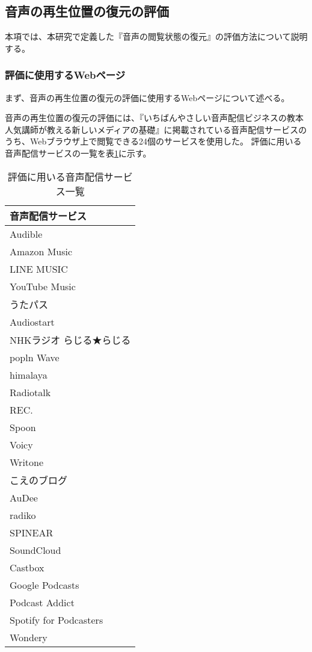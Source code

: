 \subsection{音声の再生位置の復元の評価}
本項では、本研究で定義した『音声の閲覧状態の復元』の評価方法について説明する。

\subsubsection{評価に使用するWebページ}
まず、音声の再生位置の復元の評価に使用するWebページについて述べる。

音声の再生位置の復元の評価には、『いちばんやさしい音声配信ビジネスの教本 人気講師が教える新しいメディアの基礎』\cite{easiest-audio-buisiness-book}に掲載されている音声配信サービスのうち、Webブラウザ上で閲覧できる24個のサービスを使用した。
評価に用いる音声配信サービスの一覧を表\ref{tb:evl-audio-service-list}に示す。

\begin{table}[htbp]
  \label{tb:evl-audio-service-list}
  \caption{評価に用いる音声配信サービス一覧}
  \begin{center}
    \begin{tabular}{|l|}
    \hline
    音声配信サービス  \\\hline\hline
    Audible \\ \hline
    Amazon Music \\ \hline
    LINE MUSIC \\ \hline
    YouTube Music \\ \hline
    うたパス \\ \hline
    Audiostart \\ \hline
    NHKラジオ らじる★らじる \\ \hline
    popln Wave \\ \hline
    himalaya \\ \hline
    Radiotalk \\ \hline
    REC. \\ \hline
    Spoon \\ \hline
    Voicy \\ \hline
    Writone \\ \hline
    こえのブログ \\ \hline
    AuDee \\ \hline
    radiko \\ \hline
    SPINEAR \\ \hline
    SoundCloud \\ \hline
    Castbox \\ \hline
    Google Podcasts \\ \hline
    Podcast Addict \\ \hline
    Spotify for Podcasters \\ \hline
    Wondery \\ \hline
    \end{tabular}
  \end{center}
\end{table}

